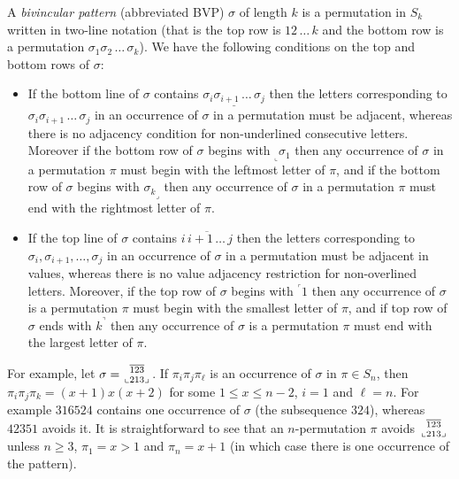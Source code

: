 \documentclass[a4paper]{llncs}
\newcommand{\pmotif}{\sigma}
\newcommand\BV[2]{\genfrac{}{}{0pt}{}{#1}{#2}}
\newcommand{\x}{X}
\newcommand{\y}{Y}
\begin{document}
A \emph{bivincular pattern} (abbreviated BVP) $\sigma$
of length $k$ is a permutation in $S_k$ written in
two-line notation
(that is the top row is $12\,\ldots\,k$ and the bottom row
is a permutation $\sigma_1\sigma_2\,\ldots\,\sigma_k$).
We have the following conditions on the top and bottom rows
of $\sigma$:
\begin{itemize}
	\item
	If the bottom line of $\sigma$ contains
	$\underline{\sigma_i\sigma_{i+1}\,\ldots\,\sigma_j}$
	then the letters corresponding to
	$\sigma_i\sigma_{i+1}\,\ldots\,\sigma_j$ in an occurrence of
	$\sigma$ in a permutation must be adjacent, whereas there is
	no adjacency condition for
	non-underlined consecutive letters.
	Moreover if the bottom row of $\sigma$ begins with
	$_\llcorner{\sigma_1}$ then any occurrence of $\sigma$
	in a permutation $\pi$ must begin with the leftmost
	letter of $\pi$,
	and
	if the bottom row of $\sigma$ begins with
	${\sigma_k}_\lrcorner$ then any occurrence of $\sigma$
	in a permutation $\pi$ must end with the rightmost
	letter of $\pi$.
	\item
	If the top line of $\sigma$ contains
	$\overline{i\,i+1\,\ldots\,j}$ then the letters corresponding to
	$\sigma_i, \sigma_{i+1}, \ldots, \sigma_j$ in an
	occurrence of $\sigma$ in a permutation must be adjacent in values,
	whereas there is no value adjacency restriction for non-overlined
	letters.
	Moreover, if the top row of $\sigma$ begins with
	$^\ulcorner{1}$ then
	any occurrence of $\sigma$ is a permutation $\pi$ must begin with
	the smallest letter of $\pi$, and
	if top row of $\sigma$ ends with $k^\urcorner$ then
	any occurrence of $\sigma$ is a permutation $\pi$ must end with
	the largest letter of $\pi$.
\end{itemize}

For example,
let
$\sigma = \BV{\overline{123}}{\llcorner 213 \lrcorner}$.
If $\pi_i\pi_j\pi_\ell$ is an occurrence of $\sigma$ in $\pi \in S_n$,
then $\pi_i\pi_j\pi_k = (x+1)x(x+2)$ for some $1 \leq x \leq n-2$,
$i=1$ and $\ell = n$.
For example $316524$ contains one occurrence of $\sigma$ (the subsequence $324$),
whereas $42351$ avoids it.
It is straightforward to see that an $n$-permutation
$\pi$ avoids $\BV{\overline{123}}{\llcorner 213 \lrcorner}$ unless
$n \geq 3$,
$\pi_1 = x > 1$
and $\pi_n = x+1$
(in which case there is one occurrence of the pattern).

\end{document}
